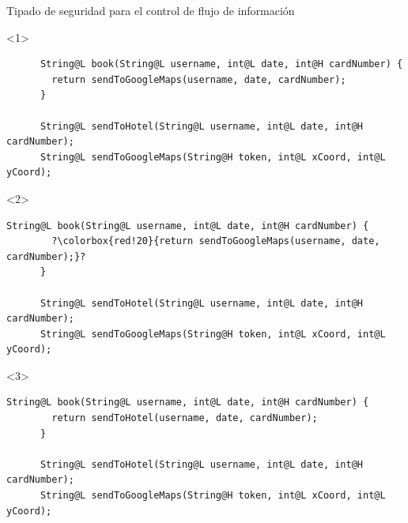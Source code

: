 \documentclass[aspectratio=169,18pt]{beamer}
\begin{document}
\begin{frame}[fragile]{Tipado de seguridad para el control de flujo de información}

  \begin{onlyenv}<1>
    \begin{lstlisting}
      String@L book(String@L username, int@L date, int@H cardNumber) {
        return sendToGoogleMaps(username, date, cardNumber);
      }

      String@L sendToHotel(String@L username, int@L date, int@H cardNumber);
      String@L sendToGoogleMaps(String@H token, int@L xCoord, int@L yCoord);
    \end{lstlisting}
  \end{onlyenv}
  \begin{onlyenv}<2>
    \begin{lstlisting}[escapechar=?]
      String@L book(String@L username, int@L date, int@H cardNumber) {
        ?\colorbox{red!20}{return sendToGoogleMaps(username, date, cardNumber);}?
      }

      String@L sendToHotel(String@L username, int@L date, int@H cardNumber);
      String@L sendToGoogleMaps(String@H token, int@L xCoord, int@L yCoord);
    \end{lstlisting} \pause
		\begin{center}
		\end{center}
  \end{onlyenv}
	\begin{onlyenv}
    \begin{lstlisting}[escapechar=?]
      String@L book(String@L username, int@L date, int@H cardNumber) {
        return sendToHotel(username, date, cardNumber);
      }

      String@L sendToHotel(String@L username, int@L date, int@H cardNumber);
      String@L sendToGoogleMaps(String@H token, int@L xCoord, int@L yCoord);
    \end{lstlisting}
  \end{onlyenv}

\end{frame}
\end{document}
